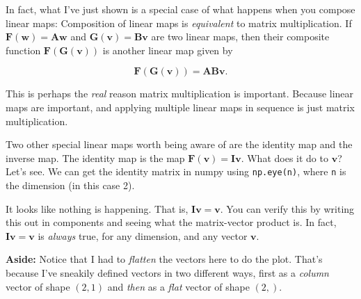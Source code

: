 \documentclass[
  letterpaper,
  DIV=11,
  numbers=noendperiod]{scrreprt}
\begin{document}
In fact, what I've just shown is a special case of what happens when you
compose linear maps: Composition of linear maps is \emph{equivalent} to
matrix multiplication. If
\(\mathbf{F}(\mathbf{w}) = \mathbf{A}\mathbf{w}\) and
\(\mathbf{G}(\mathbf{v}) = \mathbf{B}\mathbf{v}\) are two linear maps,
then their composite function \(\mathbf{F}(\mathbf{G}(\mathbf{v}))\) is
another linear map given by

\[\mathbf{F}(\mathbf{G}(\mathbf{v})) = \mathbf{A}\mathbf{B}\mathbf{v}.\]

This is perhaps the \emph{real} reason matrix multiplication is
important. Because linear maps are important, and applying multiple
linear maps in sequence is just matrix multiplication.

Two other special linear maps worth being aware of are the identity map
and the inverse map. The identity map is the map
\(\mathbf{F}(\mathbf{v}) = \mathbf{I}\mathbf{v}\). What does it do to
\(\mathbf{v}\)? Let's see. We can get the identity matrix in numpy using
\texttt{np.eye(n)}, where \texttt{n} is the dimension (in this case 2).

It looks like nothing is happening. That is,
\(\mathbf{I}\mathbf{v} = \mathbf{v}\). You can verify this by writing
this out in components and seeing what the matrix-vector product is. In
fact, \(\mathbf{I}\mathbf{v} = \mathbf{v}\) is \emph{always} true, for
any dimension, and any vector \(\mathbf{v}\).

\textbf{Aside:} Notice that I had to \emph{flatten} the vectors here to
do the plot. That's because I've sneakily defined vectors in two
different ways, first as a \emph{column} vector of shape \((2,1)\) and
\emph{then} as a \emph{flat} vector of shape \((2,)\).
\end{document}
